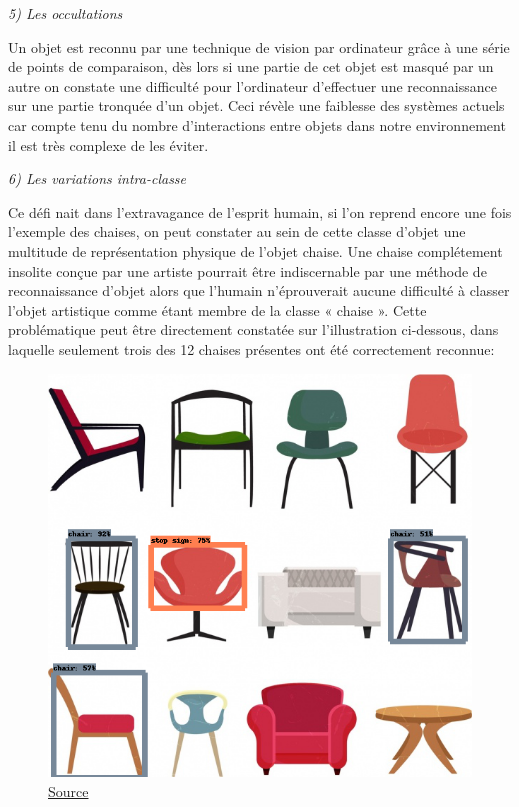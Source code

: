 \documentclass[a4paper,12pt]{article} %
\begin{document}
\textit{5)	Les occultations}\newline

Un objet est reconnu par une technique de vision par ordinateur grâce à une série de points de comparaison, dès lors si une partie de cet objet est masqué par un autre on constate une difficulté pour l’ordinateur d’effectuer une reconnaissance sur une partie tronquée d’un objet. Ceci révèle une faiblesse des systèmes actuels car compte tenu du nombre d’interactions entre objets dans notre environnement il est très complexe de les éviter. \newline

\textit{6)	Les variations intra-classe}\newline

Ce défi nait dans l’extravagance de l’esprit humain, si l’on reprend encore une fois l’exemple des chaises, on peut constater au sein de cette classe d’objet une multitude de représentation physique de l’objet chaise. Une chaise complétement insolite conçue par une artiste pourrait être indiscernable par une méthode de reconnaissance d’objet alors que l’humain n’éprouverait aucune difficulté à classer l’objet artistique comme étant membre de la classe « chaise ». Cette problématique peut être directement constatée sur l'illustration ci-dessous, dans laquelle seulement trois des 12 chaises présentes ont été correctement reconnue:\newline
\begin{figure}[h] %
  \centering %
  \includegraphics[scale=0.28]{chairAfterReco.png} %
  \caption{\href{ http://gofreedownload.net/free-vector/vector-abstract/furniture-chairs-icons-collection-various-colored-types-263171/}{Source} }
\end{figure}
\newpage
\end{document}
